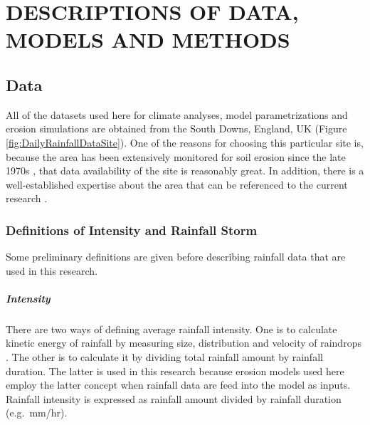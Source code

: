 \chapter{DESCRIPTIONS OF DATA, MODELS AND METHODS}
\label{sec:SIMULATIONDATAMODELSANDMETHODS}

\section{Data}
\label{sec:Data}

All of the datasets used here for climate analyses, model parametrizations and
erosion simulations are obtained from the South Downs, England, UK (Figure
\ref{fig:DailyRainfallDataSite}).
One of the reasons for choosing this particular site is, because the area has
been extensively monitored for soil erosion since the late 1970s
\citep{boardman1995-177,boardman2003-176}, that data availability of the
site is reasonably great. In addition, there is a well-established expertise
about the area that can be referenced to the current research
\citep{boardman1995-177,favis-mortlock1995-365,favis-mortlock1997-79,
favis-mortlock1998-141,boardman2001-346,boardman2003-176}.


\subsection{Definitions of Intensity and Rainfall Storm}

Some preliminary definitions are given before describing rainfall data that are
used in this research.

\paragraph{Intensity} There are two ways of defining average
rainfall intensity. One is to calculate kinetic energy of rainfall by measuring
size, distribution and velocity of raindrops \citep{vandijk2002-1}. The other is
to calculate it by dividing total rainfall amount by rainfall duration. The
latter is used in this research because erosion models used here employ the
latter concept when rainfall data are feed into the model as inputs. Rainfall
intensity is expressed as rainfall amount divided by rainfall duration (e.g.\
mm/hr).


